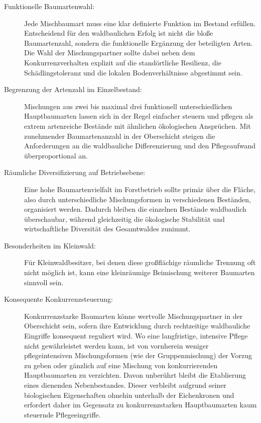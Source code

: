 \documentclass[twocolumn, bibliography=totoc, abstract=true]{scrartcl}
\begin{document}
\begin{description}
\item[Funktionelle Baumartenwahl:] Jede Mischbaumart muss eine klar definierte Funktion im Bestand erfüllen. Entscheidend für den waldbaulichen Erfolg ist nicht die bloße Baumartenzahl, sondern die funktionelle Ergänzung der beteiligten Arten. Die Wahl der Mischungspartner sollte dabei neben dem Konkurrenzverhalten explizit auf die standörtliche Resilienz, die Schädlingstoleranz und die lokalen Bodenverhältnisse abgestimmt sein.
\item[Begrenzung der Artenzahl im Einzelbestand:] Mischungen aus zwei bis maximal drei funktionell unterschiedlichen Hauptbaumarten lassen sich in der Regel einfacher steuern und pflegen als extrem artenreiche Bestände mit ähnlichen ökologischen Ansprüchen. Mit zunehmender Baumartenanzahl in der Oberschicht steigen die Anforderungen an die waldbauliche Differenzierung und den Pflegeaufwand überproportional an.
\item[Räumliche Diversifizierung auf Betriebsebene:] Eine hohe Baumartenvielfalt im Forstbetrieb sollte primär über die Fläche, also durch unterschiedliche Mischungsformen in verschiedenen Beständen, organisiert werden. Dadurch bleiben die einzelnen Bestände waldbaulich überschaubar, während gleichzeitig die ökologische Stabilität und wirtschaftliche Diversität des Gesamtwaldes zunimmt.
\item[Besonderheiten im Kleinwald:] Für Kleinwaldbesitzer, bei denen diese großflächige räumliche Trennung oft nicht möglich ist, kann eine kleinräumige Beimischung weiterer Baumarten sinnvoll sein.
\item[Konsequente Konkurrenzsteuerung:] Konkurrenzstarke Baumarten könne wertvolle Mischungspartner in der Oberschicht sein, sofern ihre Entwicklung durch rechtzeitige waldbauliche Eingriffe konsequent reguliert wird. Wo eine langfristige, intensive Pflege nicht gewährleistet werden kann, ist von vornherein weniger pflegeintensiven Mischungsformen (wie der Gruppenmischung) der Vorzug zu geben oder gänzlich auf eine Mischung von konkurrierenden Hauptbaumarten zu verzichten. Davon unberührt bleibt die Etablierung eines dienenden Nebenbestandes. Dieser verbleibt aufgrund seiner biologischen Eigenschaften ohnehin unterhalb der Eichenkronen und erfordert daher im Gegensatz zu konkurrenzstarken Hauptbaumarten kaum steuernde Pflegeeingriffe.

\end{description}
\end{document}
